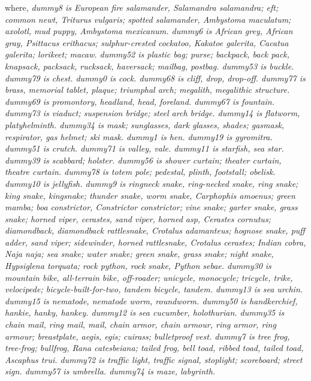 \documentclass[runningheads]{llncs}
\begin{document}
\begin{enumerate}
    where, \textit{dummy8 is European fire salamander, Salamandra salamandra; eft; common newt, Triturus vulgaris; spotted salamander, Ambystoma maculatum; axolotl, mud puppy, Ambystoma mexicanum. dummy6 is African grey, African gray, Psittacus erithacus; sulphur-crested cockatoo, Kakatoe galerita, Cacatua galerita; lorikeet; macaw. dummy52 is plastic bag; purse; backpack, back pack, knapsack, packsack, rucksack, haversack; mailbag, postbag. dummy53 is buckle. dummy79 is chest. dummy0 is cock. dummy68 is cliff, drop, drop-off. dummy77 is brass, memorial tablet, plaque; triumphal arch; megalith, megalithic structure. dummy69 is promontory, headland, head, foreland. dummy67 is fountain. dummy73 is viaduct; suspension bridge; steel arch bridge. dummy14 is flatworm, platyhelminth. dummy34 is mask; sunglasses, dark glasses, shades; gasmask, respirator, gas helmet; ski mask. dummy1 is hen. dummy19 is gyromitra. dummy51 is crutch. dummy71 is valley, vale. dummy11 is starfish, sea star. dummy39 is scabbard; holster. dummy56 is shower curtain; theater curtain, theatre curtain. dummy78 is totem pole; pedestal, plinth, footstall; obelisk. dummy10 is jellyfish. dummy9 is ringneck snake, ring-necked snake, ring snake; king snake, kingsnake; thunder snake, worm snake, Carphophis amoenus; green mamba; boa constrictor, Constrictor constrictor; vine snake; garter snake, grass snake; horned viper, cerastes, sand viper, horned asp, Cerastes cornutus; diamondback, diamondback rattlesnake, Crotalus adamanteus; hognose snake, puff adder, sand viper; sidewinder, horned rattlesnake, Crotalus cerastes; Indian cobra, Naja naja; sea snake; water snake; green snake, grass snake; night snake, Hypsiglena torquata; rock python, rock snake, Python sebae. dummy30 is mountain bike, all-terrain bike, off-roader; unicycle, monocycle; tricycle, trike, velocipede; bicycle-built-for-two, tandem bicycle, tandem. dummy13 is sea urchin. dummy15 is nematode, nematode worm, roundworm. dummy50 is handkerchief, hankie, hanky, hankey. dummy12 is sea cucumber, holothurian. dummy35 is chain mail, ring mail, mail, chain armor, chain armour, ring armor, ring armour; breastplate, aegis, egis; cuirass; bulletproof vest. dummy7 is tree frog, tree-frog; bullfrog, Rana catesbeiana; tailed frog, bell toad, ribbed toad, tailed toad, Ascaphus trui. dummy72 is traffic light, traffic signal, stoplight; scoreboard; street sign. dummy57 is umbrella. dummy74 is maze, labyrinth.}

\end{enumerate}
\end{document}
